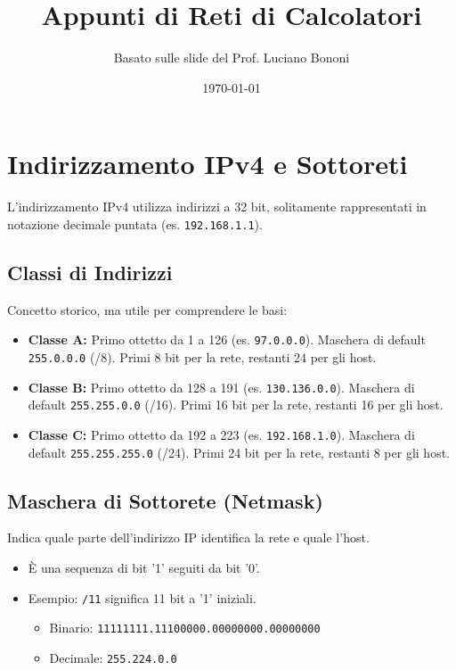 \documentclass{article}
\title{Appunti di Reti di Calcolatori}
\author{Basato sulle slide del Prof. Luciano Bononi}
\date{\today}
\begin{document}
\maketitle
\tableofcontents
\newpage

\section{Indirizzamento IPv4 e Sottoreti}
L'indirizzamento IPv4 utilizza indirizzi a 32 bit, solitamente rappresentati in notazione decimale puntata (es. \texttt{192.168.1.1}).

\subsection{Classi di Indirizzi}
Concetto storico, ma utile per comprendere le basi:
\begin{itemize}
    \item \textbf{Classe A:} Primo ottetto da 1 a 126 (es. \texttt{97.0.0.0}). Maschera di default \texttt{255.0.0.0} (/8). Primi 8 bit per la rete, restanti 24 per gli host.
    \item \textbf{Classe B:} Primo ottetto da 128 a 191 (es. \texttt{130.136.0.0}). Maschera di default \texttt{255.255.0.0} (/16). Primi 16 bit per la rete, restanti 16 per gli host.
    \item \textbf{Classe C:} Primo ottetto da 192 a 223 (es. \texttt{192.168.1.0}). Maschera di default \texttt{255.255.255.0} (/24). Primi 24 bit per la rete, restanti 8 per gli host.
\end{itemize}

\subsection{Maschera di Sottorete (Netmask)}
Indica quale parte dell'indirizzo IP identifica la rete e quale l'host.
\begin{itemize}
    \item È una sequenza di bit '1' seguiti da bit '0'.
    \item Esempio: \texttt{/11} significa 11 bit a '1' iniziali.
    \begin{itemize}
        \item Binario: \texttt{11111111.11100000.00000000.00000000}
        \item Decimale: \texttt{255.224.0.0}
    \end{itemize}
\end{itemize}
\end{document}
